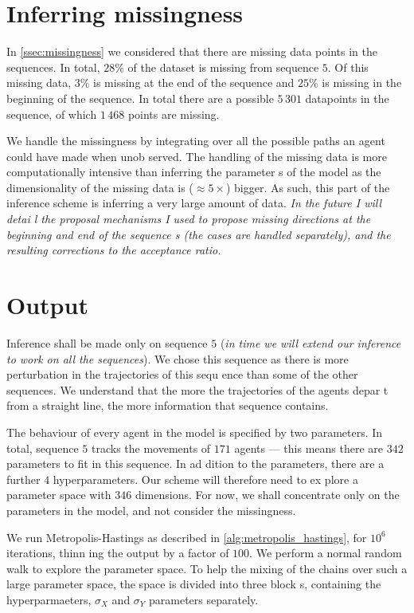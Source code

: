 \section{Inferring missingness}
\label{ssec:vicsek_paths}


In \cref{ssec:missingness} we considered that there are missing data points in the sequences. In total,
 $28\%$ of the dataset is missing from sequence $5$. Of this missing data, $3\%$ is missing at the end 
of the sequence and $25\%$ is missing in the beginning of the sequence. In total there are a possible $
5\,301$ datapoints in the sequence, of which $1\,468$ points are missing.

We handle the missingness by integrating over all the possible paths an agent could have made when unob
served. The handling of the missing data is more computationally intensive than inferring the parameter
s of the model as the dimensionality of the missing data is ($\approx 5 \times$) bigger. As such, this 
part of the inference scheme is inferring a very large amount of data. \emph{In the future I will detai
l the proposal mechanisms I used to propose missing directions at the beginning and end of the sequence
s (the cases are handled separately), and the resulting corrections to the acceptance ratio.}

\section{Output}
\label{ssec:vicsek_params}

Inference shall be made only on sequence $5$ (\emph{in time we will extend our inference to work on all
 the sequences}). We chose this sequence as there is more perturbation in the trajectories of this sequ
ence than some of the other sequences. We understand that the more the trajectories of the agents depar
t from a straight line, the more information that sequence contains.

The behaviour of every agent in the model is specified by two parameters. In total, sequence $5$ tracks
 the movements of $171$ agents --- this means there are $342$ parameters to fit in this sequence. In ad
dition to the parameters, there are a further $4$ hyperparameters. Our scheme will therefore need to ex
plore a parameter space with $346$ dimensions. For now, we shall concentrate only on the parameters in 
the model, and not consider the missingness.

We run Metropolis-Hastings as described in \cref{alg:metropolis_hastings}, for $10^6$ iterations, thinn
ing the output by a factor of $100$. We perform a normal random walk to explore the parameter space. To
 help the mixing of the chains over such a large parameter space, the space is divided into three block
s, containing the hyperparmaeters, $\sigma_X$ and $\sigma_Y$ parameters separately.

